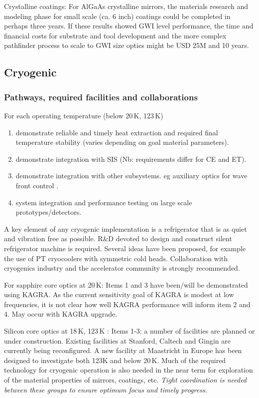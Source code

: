 Crystalline coatings: For AlGaAs crystalline mirrors, the materials research and modeling phase for small scale (ca. 6 inch) coatings could be completed in perhaps three years. If these results showed GWI level performance, the time and financial costs for substrate and tool development and the more complex pathfinder process to scale to GWI size optics might be USD 25M and 10 years. 


\subsection{Cryogenic}
\subsubsection{Pathways, required facilities and collaborations}
%
For each operating temperature (below 20\,K, 123\,K)


\begin{enumerate}
\item demonstrate reliable and timely  heat extraction and required final temperature stability (varies depending on goal material parameters).
\item demonstrate integration with SIS   (Nb: requirements differ for CE and ET).
\item demonstrate integration with other subsystems.  eg auxiliary optics  for  wave front control .
\item system integration and performance  testing on large scale prototypes/detectors.
\end{enumerate}

A key element of any cryogenic implementation is a refrigerator that is as quiet and vibration free as possible. R\&D devoted to design and construct silent refrigerator machine is required.  Several ideas have been proposed, for example the use of PT cryocoolers with symmetric cold heads.  Collaboration with cryogenics industry and the accelerator community is strongly recommended. 

For sapphire core optics at 20\,K:   Items 1 and 3 have been/will be demonstrated using KAGRA.  As the current sensitivity goal of KAGRA is modest at low frequencies, it is not clear how well KAGRA performance will inform item 2 and 4.  May occur with KAGRA upgrade.

Silicon core optics at 18\,K, 123\,K : Items 1-3:  a number of facilities are planned or under construction.  Existing facilities  at Stanford, Caltech and Gingin are currently being reconfigured. A  new facility at Maastricht in Europe has been designed to investigate  both 123K and  below 20\,K. Much of the required technology for cryogenic operation is also needed in the near term for  exploration of  the material properties of mirrors, coatings, etc.  \textit{Tight coordination is needed between these groups to  ensure optimum focus and timely progress.}

